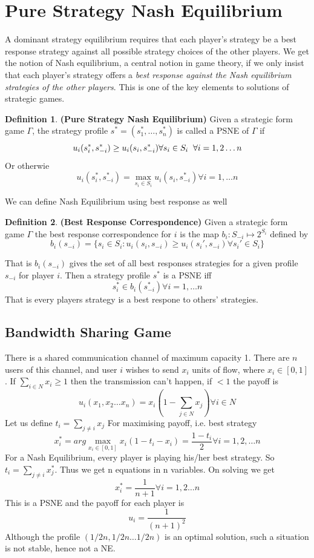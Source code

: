 \documentclass{article}
\theoremstyle{definition}
\newtheorem{defn}{Definition}[section]
\begin{document}
\section{Pure Strategy Nash Equilibrium}
A dominant strategy equilibrium requires that each player’s strategy be a best response strategy against all possible strategy choices of the other players. We get the notion of Nash equilibrium, a central notion in game theory, if we only insist that each player’s strategy offers a \textit{best response against the Nash equilibrium strategies of the other players}. This is one of the key elements to solutions of strategic games.
\begin{defn}
\textbf{(Pure Strategy Nash Equilibrium)} Given a strategic form game $\Gamma$, the strategy profile $s^* = (s_1^*,\dots, s_n^*)$ is called a PSNE of $\Gamma$ if $$u_i(s_i^*,s_{-i}^*)\geq u_i(s_i,s_{-i}^*)\forall s_i\in S_i \hspace{2mm} \forall i = 1,2\dots n$$ Or otherwie $$u_i(s_i^*,s_{-i}^*) = \max_{s_i\in S_i} u_i(s_i,s_{-i}^*) \forall i = 1,\dots n$$
\end{defn}
We can define Nash Equilibrium using best response as well
\begin{defn}
\textbf{(Best Response Correspondence)} Given a strategic form game $\Gamma$ the best response correspondence for $i$ is the map $b_i : S_{-i}\mapsto 2^{S_i}$ defined by $$b_i(s_{-i}) = \{s_i\in S_i : u_i(s_i,s_{-i})\geq u_i(s_i',s_{-i}) \forall s_i' \in S_i\}$$
\end{defn}
That is $b_i(s_{-i})$ gives the set of all best responses strategies for a given profile $s_{-i}$ for player $i$. Then a strategy profile $s^*$ is a PSNE iff $$s_i^* \in b_i(s_{-i}^*) \forall i =1,\dots n$$ That is every players strategy is a best respone to others' strategies.
\subsection{Bandwidth Sharing Game}
There is a shared communication channel of maximum capacity 1. There are $n$ users of this channel, and user $i$ wishes to send $x_i$ units of flow, where $x_i \in[0,1]$. If $\sum_{i\in N} x_i \geq 1$ then the transmission can't happen, if $<1$ the payoff is $$u_i(x_1,x_2\dots x_n) = x_i(1 - \sum_{j \in N} x_j) \forall i\in N$$ Let us define $t_i = \sum_{j\neq i}x_j$ For maximising payoff, i.e. best strategy $$x_i^* = arg\max_{x_i\in[0,1]} x_i(1-t_i-x_i) = \frac{1-t_i}{2} \forall i = 1,2,\dots n$$
For a Nash Equilibrium, every player is playing his/her best strategy. So $t_i = \sum_{j \neq i} x_j^*$. Thus we get n equations in n variables. On solving we get $$x_i^* = \frac{1}{n+1} \forall i = 1,2\dots n$$ This is a PSNE and the payoff for each player is $$u_i = \frac{1}{(n+1)^2}$$ Although the profile $(1/2n,1/2n \dots 1/2n)$ is an optimal solution, such a situation is not stable, hence not a NE.
\end{document}
